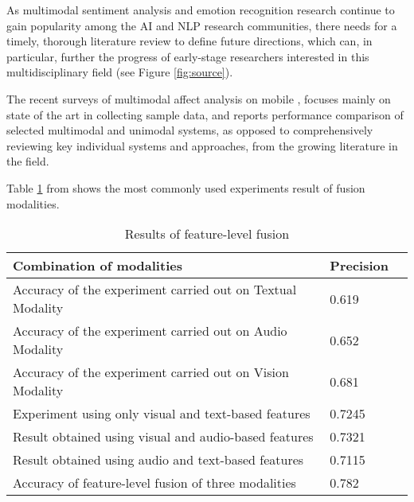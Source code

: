 As multimodal sentiment analysis and emotion recognition research continue to gain popularity among the AI and NLP research communities, there needs for a timely, thorough literature review to define future directions, which can, in particular, further the progress of early-stage researchers interested in this multidisciplinary field (see Figure \ref{fig:source}).


The recent surveys of multimodal affect analysis on mobile \cite{d2015review, poria2016fusing, Poria2017},
focuses mainly on state of the art in collecting sample data, and reports performance comparison of selected multimodal and unimodal systems, as opposed to comprehensively reviewing key individual systems and approaches, from the growing literature in the field.

Table \ref{tab:feature-level} from \cite{d2015review} shows the most commonly used experiments result of fusion modalities.

\begin{table}
  \tiny
  \caption{Results of feature-level fusion}
  \label{tab:feature-level}
  \scriptsize
  \begin{center}
    \begin{tabular}{lll}
      Combination of modalities & Precision  \\
    \hline
    Accuracy of the experiment carried out on Textual Modality & 0.619   \\
    Accuracy of the experiment carried out on Audio Modality   & 0.652  \\
    Accuracy of the experiment carried out on Vision Modality   & 0.681  \\
    Experiment using only visual and text-based features       & 0.7245 \\
    Result obtained using visual and audio-based features      & 0.7321 \\
    Result obtained using audio and text-based features        & 0.7115 \\
    Accuracy of feature-level fusion of three modalities       & 0.782 
    \end{tabular}
  \end{center}
\end{table}

